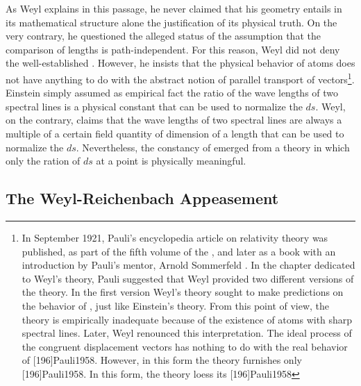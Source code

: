 \documentclass[draft]{article}
\newcommand{\WT}{Weyl's theory\xspace}
\begin{document}
As Weyl explains in this passage, he never claimed that his geometry entails in its mathematical structure alone the \apr justification of its physical truth. On the very contrary, he questioned the alleged \apr status of the assumption that the comparison of lengths is path-independent. For this reason, Weyl did not deny the well-established . However, he insists that the physical behavior of atoms does not have anything to do with the abstract notion of parallel transport of vectors\footnote{\label{pauli}In September 1921, Pauli's encyclopedia article on relativity theory was published, as part of the fifth volume of the , and later as a book with an introduction by Pauli's mentor, Arnold Sommerfeld \citep{Pauli1921}. In the chapter dedicated to \WT, Pauli suggested that Weyl provided two different versions of the theory. In the first version \WT sought to make predictions on the behavior of \rac, just like Einstein's theory. From this point of view, the theory is empirically inadequate because of the existence of atoms with sharp spectral lines. Later, Weyl renounced this interpretation. The ideal process of the congruent displacement vectors has nothing to do with the real behavior of \rac {}[196]{Pauli1958}. However, in this form the theory furnishes only  [196]{Pauli1958}. In this form, the theory loess its  [196]{Pauli1958}}. Einstein simply assumed as empirical fact the ratio of the wave lengths of two spectral lines is a  physical constant that can be used to normalize the $ds$. Weyl, on the contrary, claims that the wave lengths of two spectral lines are always a multiple of a certain field quantity of dimension of a length that can be used to normalize the $ds$. Nevertheless, the constancy of emerged from a theory in which only the ration of $ds$ at a point is physically meaningful.

\subsection{The Weyl-Reichenbach Appeasement}

  
\end{document}
